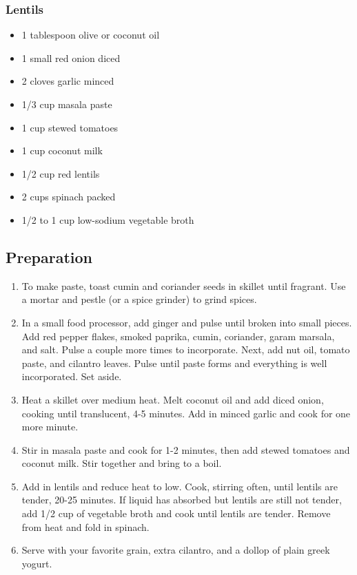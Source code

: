 \subsubsection{Lentils}
\begin{multicols}{2}
\begin{itemize}
  \item 1 tablespoon olive or coconut oil
  \item 1   small red onion diced
  \item 2   cloves garlic minced
  \item 1/3 cup masala paste
  \item 1   cup stewed tomatoes
  \item 1   cup coconut milk
  \item 1/2 cup red lentils
  \item 2   cups spinach packed
  \item 1/2 to 1 cup low-sodium vegetable broth
\end{itemize}
\end{multicols}

\subsection{Preparation}
\begin{enumerate}
  \item To make paste, toast cumin and coriander seeds in skillet until fragrant. Use a mortar and pestle (or a spice grinder) to grind spices.
  \item In a small food processor, add ginger and pulse until broken into small pieces. Add red pepper flakes, smoked paprika, cumin, coriander, garam marsala, and salt. Pulse a couple more times to incorporate. Next, add nut oil, tomato paste, and cilantro leaves. Pulse until paste forms and everything is well incorporated. Set aside.
  \item Heat a skillet over medium heat. Melt coconut oil and add diced onion, cooking until translucent, 4-5 minutes. Add in minced garlic and cook for one more minute.
  \item Stir in masala paste and cook for 1-2 minutes, then add stewed tomatoes and coconut milk. Stir together and bring to a boil.
  \item Add in lentils and reduce heat to low. Cook, stirring often, until lentils are tender, 20-25 minutes. If liquid has absorbed but lentils are still not tender, add 1/2 cup of vegetable broth and cook until lentils are tender. Remove from heat and fold in spinach.
  \item Serve with your favorite grain, extra cilantro, and a dollop of plain greek yogurt.
\end{enumerate}

